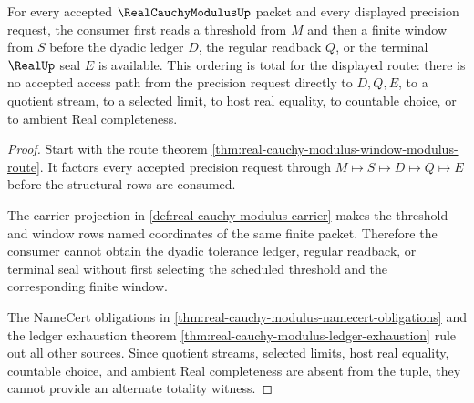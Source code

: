 \begin{theorem}
\label{thm:real-cauchy-modulus-threshold-window-totality}
For every accepted $\RealCauchyModulusUp$ packet and every displayed precision request, the consumer first reads a threshold from $M$ and then a finite window from $S$ before the dyadic ledger $D$, the regular readback $Q$, or the terminal $\RealUp$ seal $E$ is available. This ordering is total for the displayed route: there is no accepted access path from the precision request directly to $D,Q,E$, to a quotient stream, to a selected limit, to host real equality, to countable choice, or to ambient Real completeness.
\end{theorem}
\begin{proof}
Start with the route theorem \autoref{thm:real-cauchy-modulus-window-modulus-route}. It factors every accepted precision request through $M\longmapsto S\longmapsto D\longmapsto Q\longmapsto E$ before the structural rows are consumed.

The carrier projection in \autoref{def:real-cauchy-modulus-carrier} makes the threshold and window rows named coordinates of the same finite packet. Therefore the consumer cannot obtain the dyadic tolerance ledger, regular readback, or terminal seal without first selecting the scheduled threshold and the corresponding finite window.

The NameCert obligations in \autoref{thm:real-cauchy-modulus-namecert-obligations} and the ledger exhaustion theorem \autoref{thm:real-cauchy-modulus-ledger-exhaustion} rule out all other sources. Since quotient streams, selected limits, host real equality, countable choice, and ambient Real completeness are absent from the tuple, they cannot provide an alternate totality witness.
\end{proof}

